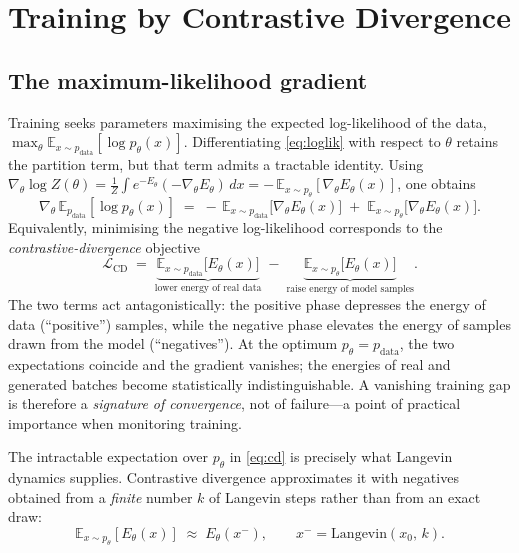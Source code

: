 \section{Training by Contrastive Divergence}
\label{sec:cd}

\subsection{The maximum-likelihood gradient}

Training seeks parameters maximising the expected log-likelihood of the data,
$\max_\theta \mathbb{E}_{x\sim p_{\mathrm{data}}}[\log p_\theta(x)]$. Differentiating
\eqref{eq:loglik} with respect to $\theta$ retains the partition term, but that term admits
a tractable identity. Using $\nabla_\theta \log Z(\theta) = \frac{1}{Z}\int
e^{-E_\theta}(-\nabla_\theta E_\theta)\,dx = -\,\mathbb{E}_{x\sim p_\theta}[\nabla_\theta
E_\theta(x)]$, one obtains
\begin{equation}
  \nabla_\theta\, \mathbb{E}_{p_{\mathrm{data}}}[\log p_\theta(x)]
  \;=\;
  -\,\mathbb{E}_{x\sim p_{\mathrm{data}}}\!\bigl[\nabla_\theta E_\theta(x)\bigr]
  \;+\; \mathbb{E}_{x\sim p_\theta}\!\bigl[\nabla_\theta E_\theta(x)\bigr].
  \label{eq:mle-grad}
\end{equation}
Equivalently, minimising the negative log-likelihood corresponds to the
\emph{contrastive-divergence} objective
\begin{equation}
  \mathcal{L}_{\mathrm{CD}}
  \;=\;
  \underbrace{\mathbb{E}_{x\sim p_{\mathrm{data}}}\!\bigl[E_\theta(x)\bigr]}_{\text{lower energy of real data}}
  \;-\;
  \underbrace{\mathbb{E}_{x\sim p_\theta}\!\bigl[E_\theta(x)\bigr]}_{\text{raise energy of model samples}}.
  \label{eq:cd}
\end{equation}
The two terms act antagonistically: the positive phase depresses the energy of data
(``positive'') samples, while the negative phase elevates the energy of samples drawn from
the model (``negatives''). At the optimum $p_\theta = p_{\mathrm{data}}$, the two
expectations coincide and the gradient vanishes; the energies of real and generated
batches become statistically indistinguishable. A vanishing training gap is therefore a
\emph{signature of convergence}, not of failure---a point of practical importance when
monitoring training.

The intractable expectation over $p_\theta$ in \eqref{eq:cd} is precisely what Langevin
dynamics supplies. Contrastive divergence approximates it with negatives obtained from a
\emph{finite} number $k$ of Langevin steps rather than from an exact draw:
\begin{equation}
  \mathbb{E}_{x\sim p_\theta}[E_\theta(x)] \;\approx\; E_\theta(x^-),
  \qquad x^- = \mathrm{Langevin}(x_0,\,k).
  \label{eq:cd-approx}
\end{equation}

